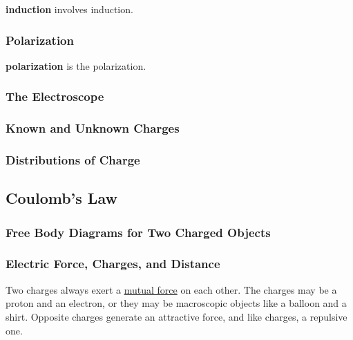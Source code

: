 \documentclass[dvipsnames]{article}
\begin{document}
\textbf{\Gls{induction}} involves \glsdesc{induction}.

\subsubsection{Polarization}

\textbf{\Gls{polarization}} is the \glsdesc{polarization}.

\subsubsection{The Electroscope}

\subsubsection{Known and Unknown Charges}

\subsubsection{Distributions of Charge}

\subsection{Coulomb's Law}

\subsubsection{Free Body Diagrams for Two Charged Objects}

\subsubsection{Electric Force, Charges, and Distance}

Two charges always exert a \href{https://phet.colorado.edu/en/simulations/coulombs-law}{mutual force} on each other. The charges may be a proton and an electron, or they may be macroscopic objects like a balloon and a shirt. Opposite charges generate an attractive force, and like charges, a repulsive one. 


\def\distanceA{5}
\def\distanceR{2}
\end{document}
